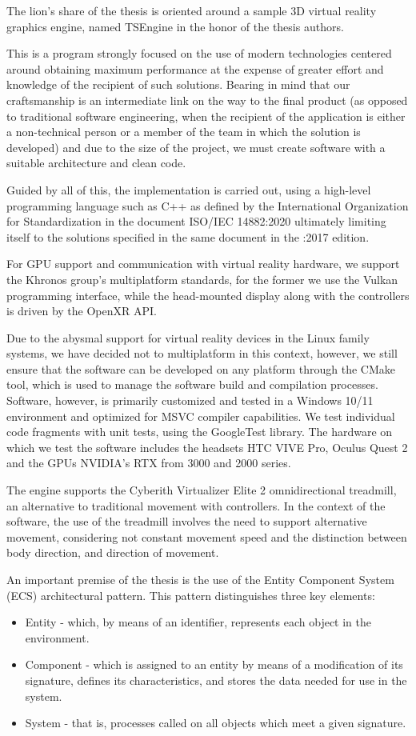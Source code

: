 The lion's share of the thesis is oriented around a sample 3D virtual reality graphics engine, named TSEngine in the honor of the thesis authors.

This is a program strongly focused on the use of modern technologies centered around obtaining maximum performance at the expense of greater effort and knowledge of the recipient of such solutions. Bearing in mind that our craftsmanship is an intermediate link on the way to the final product (as opposed to traditional software engineering, when the recipient of the application is either a non-technical person or a member of the team in which the solution is developed) and due to the size of the project, we must create software with a suitable architecture and clean code.

Guided by all of this, the implementation is carried out, using a high-level programming language such as C++ as defined by the International Organization for Standardization in the document ISO/IEC 14882:2020 ultimately limiting itself to the solutions specified in the same document in the :2017 edition.

For GPU support and communication with virtual reality hardware, we support the Khronos group's multiplatform standards, for the former we use the Vulkan programming interface, while the head-mounted display along with the controllers is driven by the OpenXR API.

Due to the abysmal support for virtual reality devices in the Linux family systems, we have decided not to multiplatform in this context, however, we still ensure that the software can be developed on any platform through the CMake tool, which is used to manage the software build and compilation processes. Software, however, is primarily customized and tested in a Windows 10/11 environment and optimized for MSVC compiler capabilities. We test individual code fragments with unit tests, using the GoogleTest library. The hardware on which we test the software includes the headsets HTC VIVE Pro, Oculus Quest 2 and the GPUs NVIDIA's RTX from 3000 and 2000 series.

The engine supports the Cyberith Virtualizer Elite 2 omnidirectional treadmill, an alternative to traditional movement with controllers. In the context of the software, the use of the treadmill involves the need to support alternative movement, considering not constant movement speed and the distinction between body direction, and direction of movement.

An important premise of the thesis is the use of the Entity Component System (ECS) architectural pattern. This pattern distinguishes three key elements:
\begin{itemize}
    \item Entity - which, by means of an identifier, represents each object in the environment.
    \item Component - which is assigned to an entity by means of a modification of its signature, defines its characteristics, and stores the data needed for use in the system.
    \item System - that is, processes called on all objects which meet a given signature.
\end{itemize}

